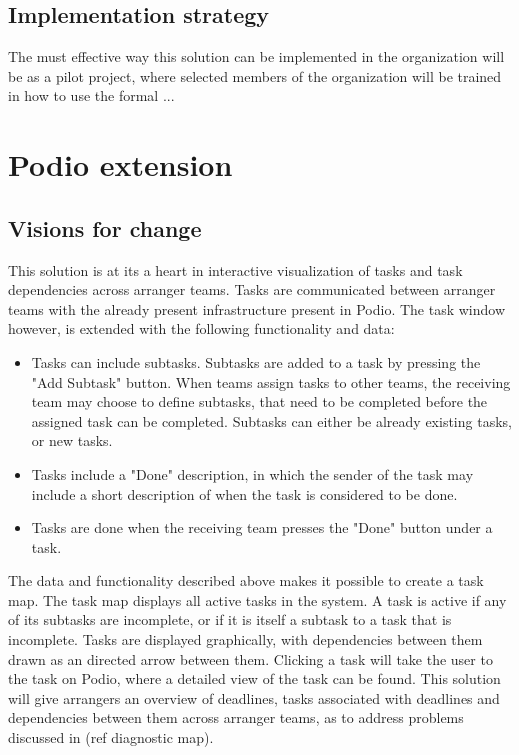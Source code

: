 \subsection{Implementation strategy}
The must effective way this solution can be implemented in the organization will be as a pilot project, where selected members of the organization will be trained in how to use the formal ... 



\section{Podio extension}
\subsection{Visions for change}
\label{visions_for_change}
This solution is at its a heart in interactive visualization of tasks and task dependencies across arranger teams. Tasks are communicated between arranger teams with the already present infrastructure present in Podio. The task window however, is extended with the following functionality and data:
\begin{itemize}
    \item Tasks can include subtasks. Subtasks are added to a task by pressing the "Add Subtask" button. When teams assign tasks to other teams, the receiving team may choose to define subtasks, that need to be completed before the assigned task can be completed. Subtasks can either be already existing tasks, or new tasks.
    \item Tasks include a "Done" description, in which the sender of the task may include a short description of when the task is considered to be done.
    \item Tasks are done when the receiving team presses the "Done" button under a task.
\end{itemize}
The data and functionality described above makes it possible to create a task map. The task map displays all active tasks in the system. A task is active if any of its subtasks are incomplete, or if it is itself a subtask to a task that is incomplete. Tasks are displayed graphically, with dependencies between them drawn as an directed arrow between them. Clicking a task will take the user to the task on Podio, where a detailed view of the task can be found. This solution will give arrangers an overview of deadlines, tasks associated with deadlines and dependencies between them across arranger teams, as to address problems discussed in (ref diagnostic map).


